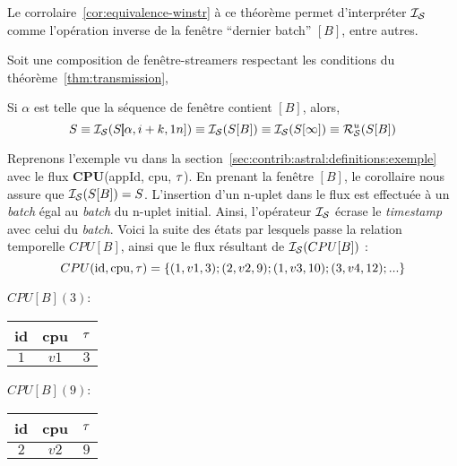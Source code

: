 Le corrolaire~\ref{cor:equivalence-winstr} à ce théorème permet d'interpréter $\mathcal{I_S}$ comme l'opération inverse de la fenêtre \enquote{dernier batch} $[B]$, entre autres.
\begin{coro}\label{cor:equivalence-winstr}
    Soit une composition de fenêtre-streamers respectant les conditions du théorème~\ref{thm:transmission},

    Si $\alpha$ est telle que la séquence de fenêtre contient $[B]$, alors,
$$S \equiv \mathcal{I_S}(S]\!\![\alpha,i+k,1n]) \equiv \mathcal{I_S}(S[B]) \equiv \mathcal{I_S}(S[\infty]) \equiv \mathcal{R}_{\mathcal S}^{u}(S[B])$$
\end{coro}

\begin{example}
Reprenons l'exemple vu dans la section~\ref{sec:contrib:astral:definitions:exemple} avec le flux \textbf{CPU}(appId, cpu, $\tau$). En prenant la fenêtre $[B]$, le corollaire nous assure que $\mathcal{I_S}(S[B])=S$. L'insertion d'un n-uplet dans le flux est effectuée à un \textit{batch} égal au \textit{batch} du n-uplet initial. Ainsi, l'opérateur $\mathcal{I_S}$ écrase le \textit{timestamp} avec celui du \textit{batch}. Voici la suite des états par lesquels passe la relation temporelle $CPU[B]$, ainsi que le flux résultant de $\mathcal{I_S}(CPU[B])$ :
$$CPU(\textrm{id},\textrm{cpu},\tau)=\{(1,v1,3);(2,v2,9);(1,v3,10);(3,v4,12);...\}$$
\noindent\begin{minipage}[c]{0.24\linewidth}
\begin{center}$CPU[B](3)$: \\ \vspace{1em}
\begin{tabular}{|c|c|c|}
\hline
id & cpu & $\tau$ \\
\hline
$1$ & $v1$ & $3$ \\
\hline
\end{tabular}\end{center}
\end{minipage} %
\begin{minipage}[c]{0.24\linewidth}
\begin{center}$CPU[B](9)$: \\ \vspace{1em}
\begin{tabular}{|c|c|c|}
\hline
id & cpu & $\tau$ \\
\hline
$2$ & $v2$ & $9$ \\
\hline
\end{tabular}\end{center}
\end{minipage} %

\end{example}
